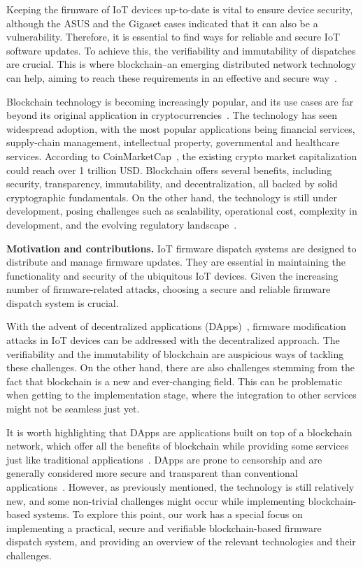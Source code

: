 \documentclass[conference]{IEEEtran}
\begin{document}
Keeping the firmware of IoT devices up-to-date is vital to ensure device security, although the ASUS and the Gigaset cases indicated that it can also be a vulnerability. Therefore, it is essential to find ways for reliable and secure IoT software updates. To achieve this, the verifiability and immutability of dispatches are crucial. This is where blockchain--an emerging distributed network technology can help, aiming to reach these requirements in an effective and secure way~\cite{Chiu2023_tii,LiWW2023_iotj}.

Blockchain technology is becoming increasingly popular, and its use cases are far beyond its original application in cryptocurrencies~\cite{b1,Shi2023}. The technology has seen widespread adoption, with the most popular applications being financial services, supply-chain management, intellectual property, governmental and healthcare services. According to CoinMarketCap~\cite{CoinMarketCap}, the existing crypto market capitalization could reach over 1 trillion USD. Blockchain offers several benefits, including security, transparency, immutability, and decentralization, all backed by solid cryptographic fundamentals. On the other hand, the technology is still under development, posing challenges such as scalability, operational cost, complexity in development, and the evolving regulatory landscape~\cite{Meng2018_ieee}.


\textbf{Motivation and contributions.} IoT firmware dispatch systems are designed to distribute and manage firmware updates. They are essential in maintaining the functionality and security of the ubiquitous IoT devices. Given the increasing number of firmware-related attacks, choosing a secure and reliable firmware dispatch system is crucial.

With the advent of decentralized applications (DApps)~\cite{Wu2021_spe}, firmware modification attacks in IoT devices can be addressed with the decentralized approach. The verifiability and the immutability of blockchain are auspicious ways of tackling these challenges. On the other hand, there are also challenges stemming from the fact that blockchain is a new and ever-changing field. This can be problematic when getting to the implementation stage, where the integration to other services might not be seamless just yet.

It is worth highlighting that DApps are applications built on top of a blockchain network, which offer all the benefits of blockchain while providing some services just like traditional applications~\cite{Chiu2022_provsec}. DApps are prone to censorship and are generally considered more secure and transparent than conventional applications~\cite{Brotsis2021}. However, as previously mentioned, the technology is still relatively new, and some non-trivial challenges might occur while implementing blockchain-based systems. To explore this point, our work has a special focus on implementing a practical, secure and verifiable blockchain-based firmware dispatch system, and providing an overview of the relevant technologies and their challenges.
\end{document}
